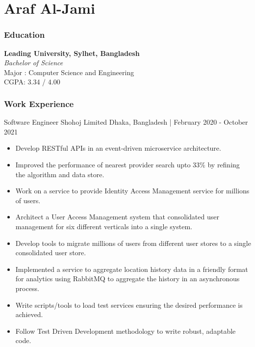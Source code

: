 \documentclass{resumestyle}
\begin{document}
\large%

\part{Araf Al-Jami}

\section{Education}%

\textbf{Leading University, Sylhet, Bangladesh}\\%
\textit{Bachelor of Science}\\%
Major : Computer Science and Engineering\\%
CGPA: 3.34 / 4.00%

\section{Work Experience}%
    \worksubsection%
        {Software Engineer}%
        {Shohoj Limited}%
        {Dhaka, Bangladesh | February 2020 - October 2021}%
    
    \begin{itemize}[labelsep=4pt,leftmargin=*,topsep=5pt,partopsep=0pt,itemsep=1pt]%
        \item Develop RESTful APIs in an event-driven microservice architecture.%
        \item Improved the performance of nearest provider search upto 33\% by refining the algorithm and data store.
        \item Work on a service to provide Identity Access Management service for millions of users.%
        \item Architect a User Access Management system that consolidated user management for six different verticals into a single system.%
        \item Develop tools to migrate millions of users from different user stores to a single consolidated user store.%
        \item Implemented a service to aggregate location history data in a friendly format for analytics using RabbitMQ to aggregate the history in an asynchronous process.%
        \item Write scripts/tools to load test services ensuring the desired performance is achieved.%
        \item Follow Test Driven Development methodology to write robust, adaptable code.%
    \end{itemize}%
\end{document}
